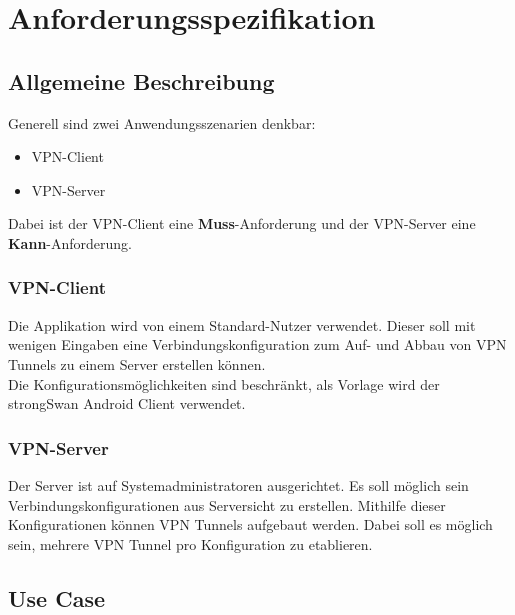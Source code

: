 \section{Anforderungsspezifikation}
\subsection{Allgemeine Beschreibung}
Generell sind zwei Anwendungsszenarien denkbar:
\begin{itemize}
	\item VPN-Client
	\item VPN-Server
\end{itemize}
\medskip
Dabei ist der VPN-Client eine \textbf{Muss}-Anforderung und der VPN-Server eine \textbf{Kann}-Anforderung.
\medskip
\subsubsection{VPN-Client}
Die Applikation wird von einem Standard-Nutzer verwendet. Dieser soll mit wenigen Eingaben eine Verbindungskonfiguration zum Auf- und Abbau von VPN Tunnels zu einem Server erstellen können. \\
Die Konfigurationsmöglichkeiten sind beschränkt, als Vorlage wird der strongSwan Android Client verwendet.\\


\subsubsection{VPN-Server}
Der Server ist auf Systemadministratoren ausgerichtet. Es soll möglich sein Verbindungskonfigurationen aus Serversicht zu erstellen. Mithilfe dieser Konfigurationen können VPN Tunnels aufgebaut werden. Dabei soll es möglich sein, mehrere VPN Tunnel pro Konfiguration zu etablieren.

\subsection{Use Case}


